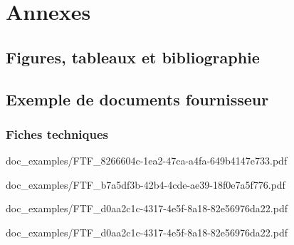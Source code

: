 \documentclass{report}
\begin{document}
\appendix
\part{Annexes}
    \chapter{Figures, tableaux et bibliographie}
        \listoftables
        \listoffigures
        
         
    \chapter{Exemple de documents fournisseur}
        \section{Fiches techniques}
        
                    {doc_examples/FTF_8266604c-1ea2-47ca-a4fa-649b4147e733.pdf}
%        

        
                    {doc_examples/FTF_b7a5df3b-42b4-4cde-ae39-18f0e7a5f776.pdf}
%        

        
                    {doc_examples/FTF_d0aa2c1c-4317-4e5f-8a18-82e56976da22.pdf}
        
                    {doc_examples/FTF_d0aa2c1c-4317-4e5f-8a18-82e56976da22.pdf}
\end{document}
